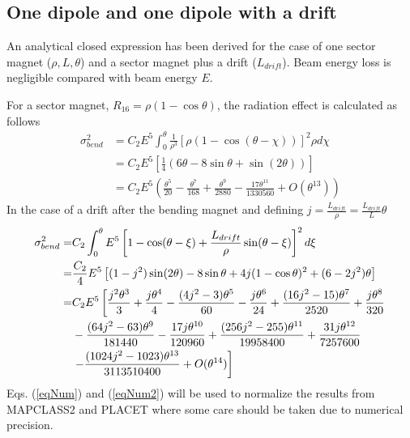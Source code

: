 \subsection{One dipole and one dipole with a drift}
An analytical closed expression has been derived for the case of one sector magnet ($\rho,L,\theta$) and a sector magnet plus a drift ($L_{drift}$). Beam energy loss is negligible compared with beam energy $E$.\par
For a sector magnet, $R_{16}= \rho(1-\cos\theta)$, the radiation effect is calculated as follows
\begin{align}
\sigma_{bend}^2 &= C_2 E^5\int_0^\theta \frac{1}{\rho^3}[\rho(1-\cos(\theta-\chi))]^2\rho d\chi\\
&= C_2E^5\left[\frac{1}{4}(6\theta-8\sin\theta+\sin(2\theta))\right]\label{eqNum}\\
&=C_2E^5\left(\frac{\theta^5}{20}-\frac{\theta^7}{168}+\frac{\theta^9}{2880}-\frac{17\theta^{11}}{1330560}+O(\theta^{13})\right)
\end{align} 
 In the case of a drift after the bending magnet and defining $j=\frac{L_{drift}}{\rho}=\frac{L_{drift}}{L}\theta$
\begin{align}
  \sigma_{bend}^2 =& C_2 \int_0^\theta E^5\left[1-\cos(\theta-\xi)+\frac{L_{drift}}{\rho}\sin(\theta-\xi)\right]^2 d\xi\\
 =& \frac{C_2}{4} E^5 \left[(1-j^2)\sin(2\theta)-8\sin\theta+4j(1-\cos\theta)^2+(6-2j^2)\theta\right]\label{eqNum2}\\
  =& C_2 E^5 \left[\frac{j^2\theta^3}{3}+\frac{j\theta^4}{4}-\frac{(4j^2-3)\theta^5}{60}- \frac{j\theta^6}{24} +\frac{(16j^2-15)\theta^7}{2520}+\frac{j\theta^8}{320}\right.\notag\\
    &-\frac{(64j^2-63)\theta^9}{181440}-\frac{17j\theta^{10}}{120960}+\frac{(256j^2-255)\theta^{11}}{19958400}+\frac{31j\theta^{12}}{7257600}\notag\\
    &\left.-\frac{(1024j^2-1023)\theta^{13}}{3113510400}+O(\theta^{14})\right]
\end{align}
Eqs. (\ref{eqNum}) and (\ref{eqNum2}) will be used to normalize the results from MAPCLASS2 and PLACET \cite{Placet} where some care should be taken due to numerical precision.\par
